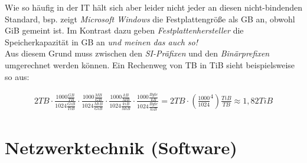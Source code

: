 \documentclass[a4paper, 12pt]{report}
\begin{document}
Wie so häufig in der IT hält sich aber leider nicht jeder an diesen 
nicht-bindenden Standard, bsp. zeigt \emph{Microsoft Windows} die 
Festplattengröße als GB an, obwohl GiB gemeint ist. Im Kontrast dazu geben
\emph{Festplattenhersteller} die Speicherkapazität in GB an \emph{und meinen 
das auch so!} \\

Aus diesem Grund muss zwischen den \emph{SI-Präfixen} und den 
\emph{Binärprefixen} umgerechnet werden können. Ein Rechenweg von TB in 
TiB sieht beispielsweise so aus: 

\begin{center}
    \begin{equation}
        \begin{split}
            2TB \cdot \frac{1000 \frac{GB}{TB}}{1024 \frac{GiB}{TiB}} 
            \cdot \frac{1000 \frac{MB}{GB}}{1024 \frac{MiB}{GiB}} 
            \cdot \frac{1000 \frac{kB}{MB}}{1024 \frac{kiB}{MiB}} 
            \cdot \frac{1000 \frac{Byte}{kB}}{1024 \frac{Byte}{kiB}} 
            = 2TB \cdot \left( \frac{1000}{1024}^4 \right) \frac{TiB}{TB} 
            \approx 1,82 TiB
        \end{split}
    \end{equation}
\end{center}


\section{Netzwerktechnik (Software)}
\end{document}
